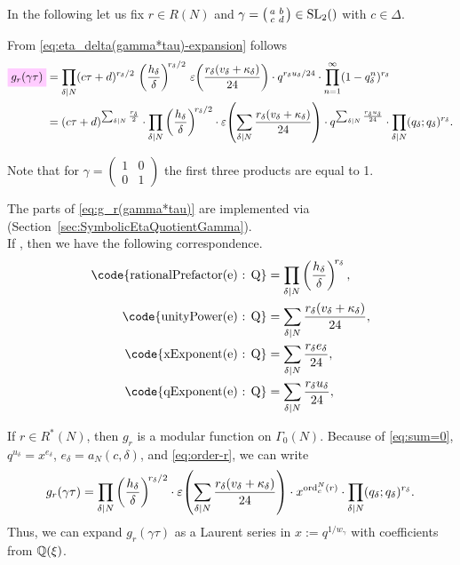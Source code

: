 \documentclass{article}
\begin{document}
In the following let us fix $r \in R(N)$ and
$\gamma =
  \bigl(
  \begin{smallmatrix}
    a & b\\
    c & d
  \end{smallmatrix}
  \bigr)
  \in \SL2Z$ with $c \in \Delta$.

From \eqref{eq:eta_delta(gamma*tau)-expansion} follows
\begin{align}
  \defineNotation[g-r-gamma-tau]{g_r(\gamma \tau)}
  &=
  \divisorprod{N}
  (c \tau+d)^{r_\delta/2}
  \,
  \left(\frac{h_\delta}{\delta}\right)^{\!r_\delta/2}
  \,
  \unityPower{\frac{r_\delta(v_\delta + \kappa_\delta)}{24}}
  \cdot
  q^{r_\delta u_\delta/24}
  \cdot
    \prod_{n=1}^{\infty}(1-q_\delta^n)^{r_\delta}
  \notag
  \\
  &=
  (c \tau+d)^{\divisorsum{N} \frac{r_\delta}{2}}
  \cdot
  \divisorprod{N}
  \left(\frac{h_\delta}{\delta}\right)^{\!r_\delta/2}
  \cdot
  \unityPower{\divisorsum{N} \frac{r_\delta(v_\delta + \kappa_\delta)}{24}}
  \cdot
  q^{\divisorsum{N} \frac{r_\delta u_\delta}{24}}
  \cdot
  \divisorprod{N} (q_\delta; q_\delta)^{r_\delta}.
  \label{eq:g_r(gamma*tau)}
\end{align}

Note that for
$\gamma=\left(\begin{smallmatrix}1&0\\0&1\end{smallmatrix}\right)$ the
first three products are equal to 1.


The parts of \eqref{eq:g_r(gamma*tau)} are implemented via
\textcolor{blue}{}
(Section~\ref{sec:SymbolicEtaQuotientGamma}).
\\
If , then we have the following
correspondence.
\begin{align*}
  \text{\code{rationalPrefactor(e) : Q}}
  &=
    \divisorprod{N} \left(\frac{h_\delta}{\delta}\right)^{\!r_\delta},
  \\
  \text{\code{unityPower(e) : Q}}
  &=
    \divisorsum{N} \frac{r_\delta(v_\delta + \kappa_\delta)}{24},
  \\
  \text{\code{xExponent(e) : Q}}
  &=
    \divisorsum{N} \frac{r_\delta e_\delta}{24},
  \\
  \text{\code{qExponent(e) : Q}}
  &=
    \divisorsum{N} \frac{r_\delta u_\delta}{24},
\end{align*}

If $r\in R^*(N)$, then $g_r$ is a modular function on $\Gamma_0(N)$.
Because of \eqref{eq:sum=0}, $q^{u_\delta}=x^{e_\delta}$,
$e_\delta=a_N(c, \delta)$, and \eqref{eq:order-r}, we can write
\begin{align}
  g_r(\gamma \tau)
  &=
  \prod_{\delta \mid N}
  \left(\frac{h_\delta}{\delta}\right)^{\!r_\delta/2}
  \cdot
  \varepsilon\!\left(\sum_{\delta \mid N} \frac{r_\delta(v_\delta + \kappa_\delta)}{24}\right)
  \cdot
  x^{\operatorname{ord}^N_c(r)}
  \cdot
  \prod_{\delta \mid N} (q_\delta; q_\delta)^{r_\delta}.\\
  \label{eq:modular-g_r(gamma*tau)}
\end{align}
Thus, we can expand $g_r(\gamma\tau)$ as a Laurent series in
$x:=q^{1/w_\gamma}$ with coefficients from $\mathbb{Q}(\xi)$.
\end{document}
